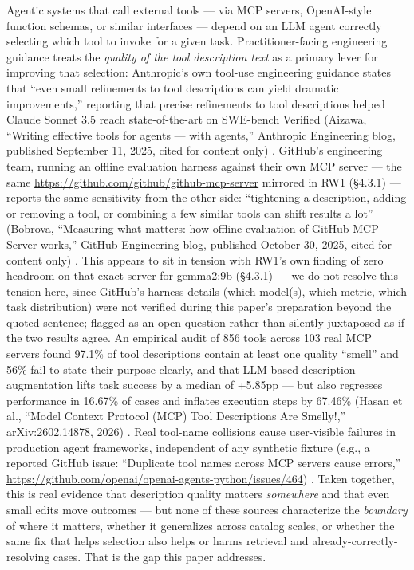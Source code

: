 Agentic systems that call external tools --- via MCP servers,
OpenAI-style function schemas, or similar interfaces --- depend on an
LLM agent correctly selecting which tool to invoke for a given task.
Practitioner-facing engineering guidance treats the \emph{quality of the
tool description text} as a primary lever for improving that selection:
Anthropic's own tool-use engineering guidance states that ``even small
refinements to tool descriptions can yield dramatic improvements,''
reporting that precise refinements to tool descriptions helped Claude
Sonnet 3.5 reach state-of-the-art on SWE-bench Verified (Aizawa,
``Writing effective tools for agents --- with agents,'' Anthropic
Engineering blog, published September 11, 2025, cited for content
only) \nocite{anthropic2025tools}. GitHub's
engineering team, running an offline evaluation harness against their
own MCP server --- the same \url{https://github.com/github/github-mcp-server} mirrored
in RW1 (§4.3.1) --- reports the same sensitivity from the other side:
``tightening a description, adding or removing a tool, or combining a
few similar tools can shift results a lot'' (Bobrova,
``Measuring what matters: how offline evaluation of GitHub MCP Server
works,'' GitHub Engineering blog, published October 30, 2025,
cited for content only) \nocite{github2025measuring}. This appears to sit in tension with RW1's own
finding of zero headroom on that exact server for gemma2:9b (§4.3.1) ---
we do not resolve this tension here, since GitHub's harness details
(which model(s), which metric, which task distribution) were not
verified during this paper's preparation beyond the quoted sentence; flagged as an open
question rather than silently juxtaposed as if the two results agree. An
empirical audit of 856 tools across 103 real MCP servers found 97.1\% of
tool descriptions contain at least one quality ``smell'' and 56\% fail
to state their purpose clearly, and that LLM-based description
augmentation lifts task success by a median of +5.85pp --- but also
regresses performance in 16.67\% of cases and inflates execution steps
by 67.46\% (Hasan et al., ``Model Context Protocol (MCP) Tool
Descriptions Are Smelly!,'' arXiv:2602.14878, 2026) \nocite{hasan2026smelly}. Real tool-name
collisions cause user-visible failures in production agent frameworks,
independent of any synthetic fixture (e.g., a reported GitHub issue:
``Duplicate tool names across MCP servers cause errors,''
\url{https://github.com/openai/openai-agents-python/issues/464}) \nocite{openai2025issue464}. Taken together, this is real
evidence that description quality matters \emph{somewhere} and that even
small edits move outcomes --- but none of these sources characterize the
\emph{boundary} of where it matters, whether it generalizes across
catalog scales, or whether the same fix that helps selection also helps
or harms retrieval and already-correctly-resolving cases. That is the
gap this paper addresses.

